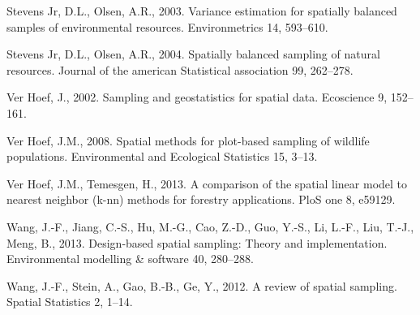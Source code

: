 \documentclass[]{elsarticle} %
\begin{document}
\leavevmode\hypertarget{ref-stevens2003variance}{}%
Stevens Jr, D.L., Olsen, A.R., 2003. Variance estimation for spatially
balanced samples of environmental resources. Environmetrics 14,
593--610.

\leavevmode\hypertarget{ref-stevens2004spatially}{}%
Stevens Jr, D.L., Olsen, A.R., 2004. Spatially balanced sampling of
natural resources. Journal of the american Statistical association 99,
262--278.

\leavevmode\hypertarget{ref-verhoef2002sampling}{}%
Ver Hoef, J., 2002. Sampling and geostatistics for spatial data.
Ecoscience 9, 152--161.

\leavevmode\hypertarget{ref-verhoef2008spatial}{}%
Ver Hoef, J.M., 2008. Spatial methods for plot-based sampling of
wildlife populations. Environmental and Ecological Statistics 15, 3--13.

\leavevmode\hypertarget{ref-ver2013comparison}{}%
Ver Hoef, J.M., Temesgen, H., 2013. A comparison of the spatial linear
model to nearest neighbor (k-nn) methods for forestry applications. PloS
one 8, e59129.

\leavevmode\hypertarget{ref-wang2013design}{}%
Wang, J.-F., Jiang, C.-S., Hu, M.-G., Cao, Z.-D., Guo, Y.-S., Li, L.-F.,
Liu, T.-J., Meng, B., 2013. Design-based spatial sampling: Theory and
implementation. Environmental modelling \& software 40, 280--288.

\leavevmode\hypertarget{ref-wang2012review}{}%
Wang, J.-F., Stein, A., Gao, B.-B., Ge, Y., 2012. A review of spatial
sampling. Spatial Statistics 2, 1--14.
\end{document}

